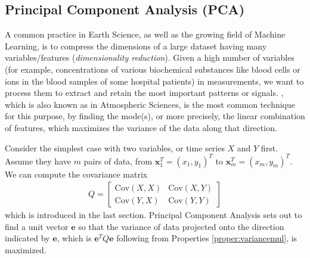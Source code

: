 \subsection{Principal Component Analysis (PCA)}
\label{subsection:PCA}
A common practice in Earth Science, as well as the growing field of Machine Learning, is to compress the dimensions of a large dataset having many variables/features (\textit{dimensionality reduction}). Given a high number of variables (for example, concentrations of various biochemical substances like blood cells or ions in the blood samples of some hospital patients) in measurements, we want to process them to extract and retain the most important patterns or signals. , which is also known as  in Atmospheric Sciences, is the most common technique for this purpose, by finding the mode(s), or more precisely, the linear combination of features, which maximizes the variance of the data along that direction. \par
Consider the simplest case with two variables, or time series $X$ and $Y$ first. Assume they have $m$ pairs of data, from $\textbf{x}_1^T = (x_1, y_1)^T$ to $\textbf{x}_m^T = (x_{m}, y_{m})^T$. We can compute the covariance matrix
\begin{align*}
Q = \begin{bmatrix}
\text{Cov}(X, X) & \text{Cov}(X, Y) \\
\text{Cov}(Y, X) & \text{Cov}(Y, Y) 
\end{bmatrix}
\end{align*}
which is introduced in the last section. Principal Component Analysis sets out to find a unit vector $\textbf{e}$ so that the variance of data projected onto the direction indicated by $\textbf{e}$, which is $\textbf{e}^T Q \textbf{e}$ following from Properties \ref{proper:variancemul}, is maximized. \par
